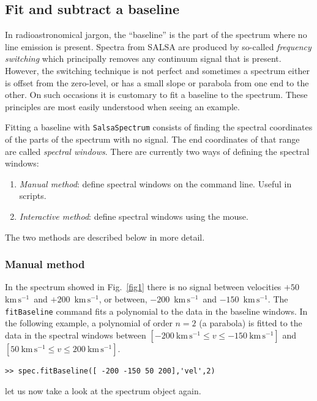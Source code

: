 \documentclass[11pt,a4paper]{article}
\newcommand\kms{$\mathrm{km} \, \mathrm{s}^{-1}$}
\newcommand\kmsmath{\mathrm{km} \, \mathrm{s}^{-1}}
\begin{document}
\subsection{Fit and subtract a baseline}
\label{sec:subtract-baseline}

In radioastronomical jargon, the ``baseline'' is the part of the
spectrum where no line emission is present. Spectra from SALSA are
produced by so-called \emph{frequency switching} which principally
removes any continuum signal that is present. However, the switching
technique is not perfect and sometimes a spectrum either is offset
from the zero-level, or has a small slope or parabola from one end to the
other. On such occasions it is customary to fit a baseline to the
spectrum. These principles are most easily understood when seeing an
example.

Fitting a baseline with \texttt{SalsaSpectrum} consists of finding the
spectral coordinates of the parts of the spectrum with no signal. The
end coordinates of that range are called \emph{spectral
  windows}. There are currently two ways of defining the spectral windows:
\begin{enumerate}
\item \emph{Manual method}: define spectral windows on the command
  line. Useful in scripts.
\item \emph{Interactive method}: define spectral windows using the
  mouse. 
\end{enumerate}
The two methods are described below in more detail.

\subsubsection{Manual method}
\label{sec:manual-method}

In the spectrum showed in Fig.~\ref{fig1} there is no signal between
velocities $+50$~\kms~and $+200$~\kms, or between, $-200$~\kms~and 
$-150$~\kms. The \texttt{fitBaseline}
command fits a polynomial to the data in the baseline windows. In the
following example, a polynomial of order $n=2$ (a parabola) is
fitted to the data in the spectral windows between $[-200~\kmsmath
\leq {v} \leq -150~\kmsmath]$ and $\left[ 50~\kmsmath \leq {v} \leq
  200~\kmsmath \right]$.
\begin{lstlisting}
>> spec.fitBaseline([ -200 -150 50 200],'vel',2)
\end{lstlisting}
\noindent
let us now take a look at the spectrum object again. 
\end{document}
